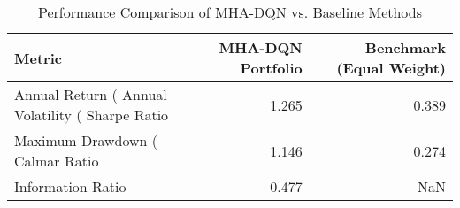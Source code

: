 \begin{table}
\caption{Performance Comparison of MHA-DQN vs. Baseline Methods}
\label{tab:performance}
\begin{tabular}{lrr}
\toprule
Metric & MHA-DQN Portfolio & Benchmark (Equal Weight) \\
\midrule
Annual Return (%
Annual Volatility (%
Sharpe Ratio & 1.265 & 0.389 \\
Maximum Drawdown (%
Calmar Ratio & 1.146 & 0.274 \\
Information Ratio & 0.477 & NaN \\
\bottomrule
\end{tabular}
\end{table}
